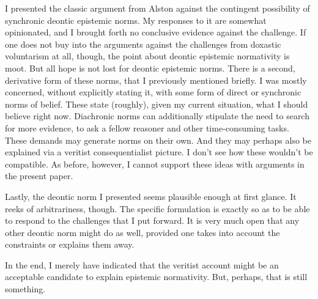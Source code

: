 \documentclass[12pt,numbers=noenddot]{scrartcl}
\begin{document}
I presented the classic argument from Alston against the contingent possibility of synchronic deontic epistemic norms. My responses to it are somewhat opinionated, and I brought forth no conclusive evidence against the challenge. If one does not buy into the arguments against the challenges from doxastic voluntarism at all, though, the point about deontic epistemic normativity is moot. But all hope is not lost for deontic epistemic norms. There is a second, derivative form of these norms, that I previously mentioned briefly. I was mostly concerned, without explicitly stating it, with some form of direct or synchronic norms of belief. These state (roughly), given my current situation, what I should believe right now. Diachronic norms can additionally stipulate the need to search for more evidence, to ask a fellow reasoner and other time-consuming tasks. These demands may generate norms on their own. And they may perhaps also be explained via a veritist consequentialist picture. I don't see how these wouldn't be compatible. As before, however, I cannot support these ideas with arguments in the present paper.

Lastly, the deontic norm I presented seems plausible enough at first glance. It reeks of arbitrariness, though. The specific formulation is exactly so as to be able to respond to the challenges that I put forward. It is very much open that any other deontic norm might do as well, provided one takes into account the constraints or explains them away. 

In the end, I merely have indicated that the veritist account might be an acceptable candidate to explain epistemic normativity. But, perhaps, that is still something.

\clearpage
\printbibliography
\end{document}
